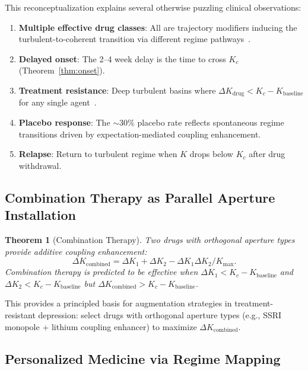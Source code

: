 \documentclass[twocolumn,10pt]{article}
\newtheorem{theorem}{Theorem}[section]
\theoremstyle{remark}
\begin{document}
This reconceptualization explains several otherwise puzzling clinical observations:

\begin{enumerate}[nosep]
  \item \textbf{Multiple effective drug classes}: All are trajectory modifiers inducing the turbulent-to-coherent transition via different regime pathways~\citep{cipriani2018comparative}.
  \item \textbf{Delayed onset}: The 2--4 week delay is the time to cross $K_c$ (Theorem~\ref{thm:onset}).
  \item \textbf{Treatment resistance}: Deep turbulent basins where $\Delta K_{\mathrm{drug}} < K_c - K_{\mathrm{baseline}}$ for any single agent~\citep{rush2006acute}.
  \item \textbf{Placebo response}: The $\sim\!30\%$ placebo rate reflects spontaneous regime transitions driven by expectation-mediated coupling enhancement.
  \item \textbf{Relapse}: Return to turbulent regime when $K$ drops below $K_c$ after drug withdrawal.
\end{enumerate}

\subsection{Combination Therapy as Parallel Aperture Installation}

\begin{theorem}[Combination Therapy]
\label{thm:combination}
Two drugs with orthogonal aperture types provide additive coupling enhancement:
\begin{equation}
  \Delta K_{\mathrm{combined}} = \Delta K_1 + \Delta K_2 - \Delta K_1 \Delta K_2 / K_{\max}.
\end{equation}
Combination therapy is predicted to be effective when $\Delta K_1 < K_c - K_{\mathrm{baseline}}$ and $\Delta K_2 < K_c - K_{\mathrm{baseline}}$ but $\Delta K_{\mathrm{combined}} > K_c - K_{\mathrm{baseline}}$.
\end{theorem}

This provides a principled basis for augmentation strategies in treatment-resistant depression: select drugs with orthogonal aperture types (e.g., SSRI monopole + lithium coupling enhancer) to maximize $\Delta K_{\mathrm{combined}}$.

\subsection{Personalized Medicine via Regime Mapping}
\end{document}
